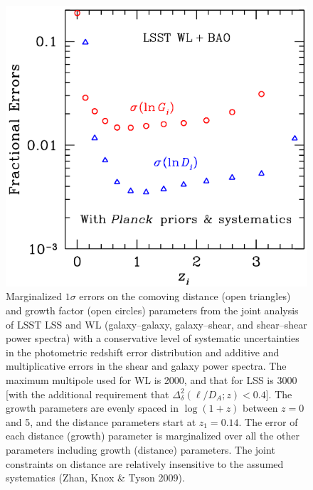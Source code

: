 


\begin{figure}
\includegraphics[width=1.0\hsize,clip]{dges.pdf}
\caption{Marginalized $1\sigma$ errors on the comoving distance
(open triangles) and growth factor (open circles) parameters from
the joint analysis of LSST LSS and WL (galaxy--galaxy, galaxy--shear,
and shear--shear power spectra) with a
conservative level of systematic uncertainties in the photometric redshift error
distribution and additive and multiplicative errors in the shear and
galaxy power spectra. The maximum multipole used for WL is
2000, and that for LSS is 3000 [with the additional requirement that
$\Delta_\delta^2(\ell/D_{A};z) < 0.4$].
The growth parameters
are evenly spaced in
$\log(1+z)$ between $z = 0$ and 5, and the distance parameters
start at $z_1 = 0.14$.
The error of each distance (growth) parameter is marginalized
over all the other parameters including growth (distance) parameters. The joint constraints on
distance are relatively insensitive to the assumed systematics
(Zhan, Knox \& Tyson 2009).}
\label{Fig:bao2}
\end{figure}


